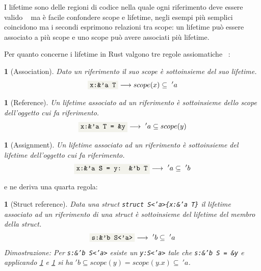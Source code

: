 \documentclass[Lau,binding=0.6cm]{sapthesis}
\newtheorem{lemma}[theorem]{}
\newcommand{\textcode}[1]{\colorbox{backcolour}{\texttt{#1}}}
\begin{document}
I lifetime sono delle regioni di codice nella quale ogni riferimento deve essere valido ~\cite[3.3]{rust:rustonomicon} ma è facile confondere scope e lifetime, negli esempi più semplici coincidono ma i secondi esprimono relazioni tra scope: un lifetime può essere associato a più scope e uno scope può avere associati più lifetime. 

Per quanto concerne i lifetime in Rust valgono tre regole assiomatiche ~\cite{mechpen:misundestand}:

\begin{lemma}[Association] \label{lemma:association}
    Dato un riferimento il suo scope è sottoinsieme del suo lifetime.
    \begin{equation*}
        \textnormal{\textcode{x:\&'a T}} \longrightarrow  scope(x) \subseteq \ 'a
    \end{equation*}
\end{lemma}

\begin{lemma}[Reference] \label{lemma:reference}
    Un lifetime associato ad un riferimento è sottoinsieme dello scope dell'oggetto cui fa riferimento. 
    \begin{equation*}
        \textnormal{\textcode{x:\&'a T = \&y}} \longrightarrow \ 'a \subseteq scope(y)
    \end{equation*}
\end{lemma}

\begin{lemma}[Assignment] \label{lemma:assignment}
    Un lifetime associato ad un riferimento è sottoinsieme del lifetime dell'oggetto cui fa riferimento.
    \begin{equation*}
        \textnormal{\textcode{x:\&'a S = y: \&'b T}} \longrightarrow \ 'a \subseteq \ 'b
    \end{equation*}
\end{lemma}

e ne deriva una quarta regola:

\begin{lemma}[Struct reference] \label{lemma:struct_reference}
    Data una struct \textnormal{\textcode{struct S<'a>\{x:\&'a T\}}} il lifetime associato ad un riferimento di una struct è sottoinsieme del lifetime del membro della struct.
    \begin{equation*}
        \textnormal{\textcode{s:\&'b S<'a>}} \longrightarrow \ 'b \subseteq \ 'a
    \end{equation*}
    Dimostrazione: \textnormal{Per \textnormal{\textcode{s:\&'b S<'a>}} esiste un \textcode{y:S<'a>} tale che \textcode{s:\&'b S = \&y} e applicando \ref{lemma:reference} e \ref{lemma:association} si ha} $ 'b \subseteq scope(y) = scope(y.x) \subseteq \ 'a  $.
\end{lemma}
\end{document}
